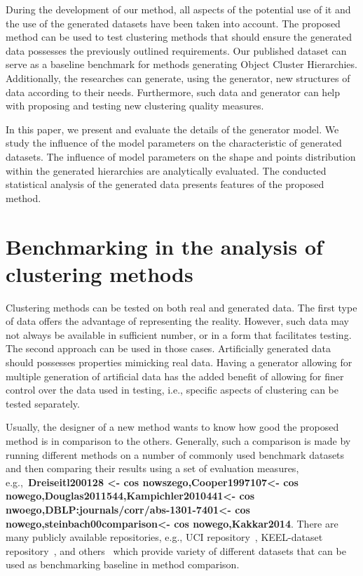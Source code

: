 \documentclass{article}
\begin{document}
    During the development of our method, all aspects of the potential use of it and the use of the generated datasets have been taken into account. The proposed method can be used to test clustering methods that should ensure the generated data possesses the previously outlined requirements. Our published dataset can serve as a baseline benchmark for methods generating Object Cluster Hierarchies. Additionally, the researches can generate, using the generator, new structures of data according to their needs. Furthermore, such data and generator can help with proposing and testing new clustering quality measures.  

In this paper, we present and evaluate the details of the generator model. We study the influence of the model parameters on the characteristic of generated datasets. The influence of model parameters on the shape and points distribution within the generated hierarchies are analytically evaluated. The conducted statistical analysis of the generated data presents features of the proposed method.

\section{Benchmarking in the analysis of clustering methods}
\label{sec:review}
Clustering methods can be tested on both real and generated data. The first type of data offers the advantage of representing the reality. However, such data may not always be available in sufficient number, or in a form that facilitates testing. The second approach can be used in those cases. Artificially generated data should possesses properties mimicking real data. Having a generator allowing for multiple generation of artificial data has the added benefit of allowing for finer control over the data used in testing, i.e., specific aspects of clustering can be tested separately.

Usually, the designer of a new method wants to know how good the proposed method is in comparison to the others. Generally, such a comparison is made by running different methods on a number of commonly used benchmark datasets and then comparing their results using a set of evaluation measures, e.g.,~\textbf{Dreiseitl200128 <- cos nowszego,Cooper1997107<- cos nowego,Douglas2011544,Kampichler2010441<- cos nwoego,DBLP:journals/corr/abs-1301-7401<- cos nowego,steinbach00comparison<- cos nowego,Kakkar2014}. There are many publicly available repositories, e.g., UCI repository~\cite{Dua2017UCI}, KEEL-dataset repository~\cite{alcala2011keel}, and others~\cite{2015ClusteringDatasets, OpenML2013} which provide variety of different datasets that can be used as benchmarking baseline in method comparison. 
\end{document}
